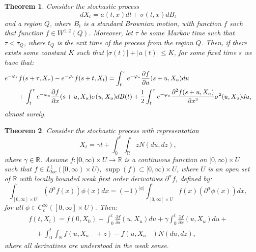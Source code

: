 \documentclass[11pt,reqno]{article}
\newtheorem{theorem}{Theorem}[section]
\theoremstyle{definition}
\begin{document}
	\begin{theorem} \label{jump1}  %
		Consider the stochastic process $$dX_t=a(t,x) dt + \sigma(t,x) d B_{t}$$ and a region $Q$, where $B_t$ is a standard Brownian motion, with function $f$ such that function $f \in W^{1,2}(Q)$. Moreover, let $\tau$ be some Markov time such that $\tau < \tau_Q$, where $t_Q$ is the exit time of the process from the region $Q$.   Then, if there exists some constant $K$ such that $|\sigma(t)|+|a(t)| \leq K$, for some fixed time $s$ we have that:
		\begin{equation}
		\begin{split}
		\MoveEqLeft
		e^{-\varphi_{\tau}} f(s+\tau, X_\tau)-e^{-\varphi_{t}} f(s+t, X_t) = \int_{t}^{\tau} e^{-\varphi_{u}}\frac{\partial f}{\partial u}(s+u, X_u) du\\
		&+\int_{t}^{\tau} e^{-\varphi_u} \frac{\partial f}{\partial x}(s+u, X_u) \sigma(u,X_u) dB(t)
		+\frac{1}{2}\int_{t}^{\tau} e^{-\varphi_{u}} \frac{\partial^2 f(s+u, X_u)}{\partial x^2} \sigma^2(u,X_u) du,
		\end{split}
		\end{equation}
		almost surely.
	\end{theorem}
	
	\begin{theorem} \label{jump2}
		Consider the stochastic process with representation
		$$
		X_t=\gamma t+\int_{0}^{t} \int_{\mathbb{R}} z N(d u, d z),$$
		where $\gamma \in \mathbb{R}$. 
		Assume $f:[0, \infty) \times U \rightarrow \mathbb{R}$ is a continuous function on $[0, \infty) \times U$ such that $f \in L_{loc}^{1}([0, \infty) \times U)$,
		$\operatorname{supp}(f) \subset[0, \infty) \times U$, where $U$ is an open set of $\mathbb{R}$
		with locally bounded weak first order derivatives $\partial^{\alpha}f$, defined by:
		$$ \int_{[0,\infty] \times U} (\partial^{\alpha}f(x))\phi(x)dx = (-1)^{|a|} \int_{[0,\infty] \times U} f(x)(\partial^{\alpha}\phi(x))dx,$$ for all $\phi \in C^{\infty}_c([0,\infty] \times U)$. Then:
		\begin{eqnarray}
		f(t, X_t)=f(0, X_0)+\int_{0}^{t} \frac{\partial f}{\partial s}(u, X_u) d u+\gamma \int_{0}^{t} \frac{\partial f}{\partial x}(u, X_u) du+\nonumber \\ 
		\quad+\int_{0}^{t} \int_{\mathbb{R}}f(u, X_{u-}+z)-f(u, X_{u-}) N(d u, d z),
		\end{eqnarray}
		where all derivatives are understood in the weak sense.
	\end{theorem}
\end{document}
